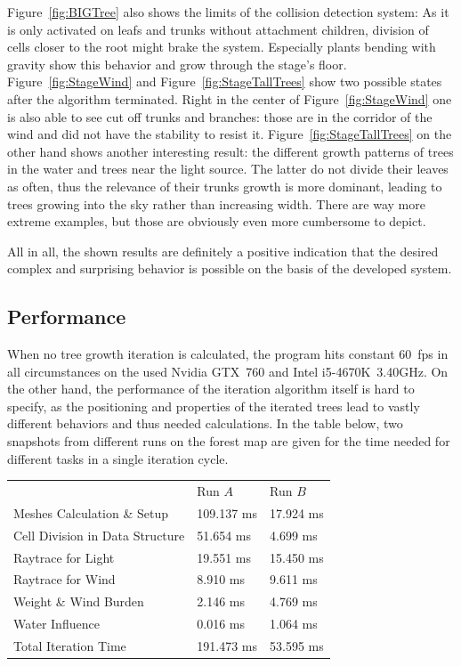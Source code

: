 \documentclass[11pt, abstract=on]{scrartcl}
\begin{document}
Figure~\ref{fig:BIGTree} also shows the limits of the collision detection system: As it is only activated on leafs and trunks without attachment children, division of cells closer to the root might brake the system. Especially plants bending with gravity show this behavior and grow through the stage's floor. Figure~\ref{fig:StageWind} and Figure~\ref{fig:StageTallTrees} show two possible states after the algorithm terminated. Right in the center of Figure~\ref{fig:StageWind} one is also able to see cut off trunks and branches: those are in the corridor of the wind and did not have the stability to resist it. Figure~\ref{fig:StageTallTrees} on the other hand shows another interesting result: the different growth patterns of trees in the water and trees near the light source. The latter do not divide their leaves as often, thus the relevance of their trunks growth is more dominant, leading to trees growing into the sky rather than increasing width. There are way more extreme examples, but those are obviously even more cumbersome to depict.

All in all, the shown results are definitely a positive indication that the desired complex and surprising behavior is possible on the basis of the developed system.

\subsection{Performance}
When no tree growth iteration is calculated, the program hits constant 60~fps in all circumstances on the used Nvidia GTX~760 and Intel i5-4670K~3.40GHz. On the other hand, the performance of the iteration algorithm itself is hard to specify, as the positioning and properties of the iterated trees lead to vastly different behaviors and thus needed calculations. In the table below, two snapshots from different runs on the forest map are given for the time needed for different tasks in a single iteration cycle.
\begin{center}
\begin{tabular}{ | l | l l |}
\hline
	& Run $A$ & Run $B$\\
\cline{2-3}
  Meshes Calculation \& Setup  & 109.137 ms & 17.924 ms\\
  Cell Division in Data Structure & 51.654 ms & 4.699 ms\\
  Raytrace for Light & 19.551 ms & 15.450 ms\\
  Raytrace for Wind & 8.910 ms & 9.611 ms \\
  Weight \& Wind Burden & 2.146 ms & 4.769 ms\\
  Water Influence & 0.016 ms & 1.064 ms\\
  Total Iteration Time & 191.473 ms & 53.595 ms\\
\hline
\end{tabular}
\end{center}
\end{document}
